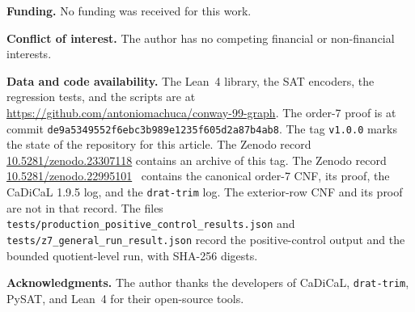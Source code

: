 \documentclass{article}
\theoremstyle{plain}
\theoremstyle{definition}
\numberwithin{equation}{section}
\begin{document}
\medskip
\noindent\textbf{Funding.} No funding was received for this work.

\medskip
\noindent\textbf{Conflict of interest.} The author has no competing financial or non-financial interests.

\medskip
\noindent\textbf{Data and code availability.} The Lean~4 library, the SAT encoders, the regression tests, and the scripts are at \url{https://github.com/antoniomachuca/conway-99-graph}. The order-7 proof is at commit \texttt{de9a5349552f6ebc3b989e1235f605d2a87b4ab8}. The tag \texttt{v1.0.0} marks the state of the repository for this article. The Zenodo record \href{https://doi.org/10.5281/zenodo.23307118}{10.5281/zenodo.23307118} contains an archive of this tag. The Zenodo record \href{https://doi.org/10.5281/zenodo.22995101}{10.5281/zenodo.22995101}~\cite{conway99_zenodo} contains the canonical order-7 CNF, its proof, the CaDiCaL 1.9.5 log, and the \texttt{drat-trim} log. The exterior-row CNF and its proof are not in that record. The files \texttt{tests/production\_positive\_control\_results.json} and \texttt{tests/z7\_general\_run\_result.json} record the positive-control output and the bounded quotient-level run, with SHA-256 digests.

\medskip
\noindent\textbf{Acknowledgments.} The author thanks the developers of CaDiCaL, \texttt{drat-trim}, PySAT, and Lean~4 for their open-source tools.



\end{document}
